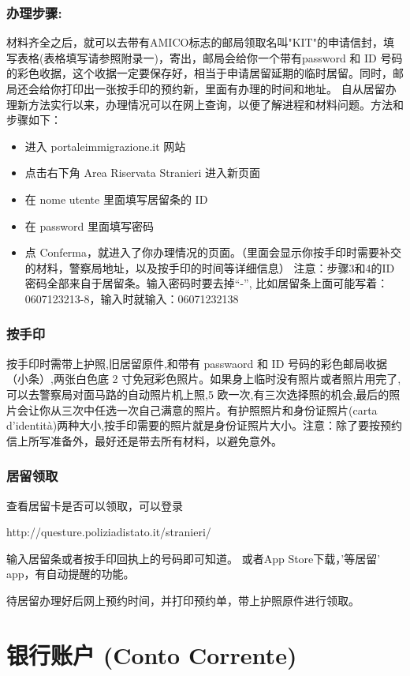 \subsubsection{办理步骤:}
材料齐全之后，就可以去带有AMICO标志的邮局领取名叫"KIT"的申请信封，填写表格(表格填写请参照附录一)，寄出，邮局会给你一个带有password 和 ID 号码的彩色收据，这个收据一定要保存好，相当于申请居留延期的临时居留。同时，邮局还会给你打印出一张按手印的预约新，里面有办理的时间和地址。
自从居留办理新方法实行以来，办理情况可以在网上查询，以便了解进程和材料问题。方法和步骤如下：
\begin{itemize} 
\item 进入 portaleimmigrazione.it 网站
\item 点击右下角 Area Riservata Stranieri 进入新页面
\item 在 nome utente 里面填写居留条的 ID
\item 在 password 里面填写密码
\item 点 Conferma，就进入了你办理情况的页面。（里面会显示你按手印时需要补交的材料，警察局地址，以及按手印的时间等详细信息）
注意：步骤3和4的ID密码全部来自于居留条。输入密码时要去掉“-”, 比如居留条上面可能写着： 0607123213-8，输入时就输入：06071232138
\end{itemize}

\subsubsection{按手印}
按手印时需带上护照,旧居留原件,和带有 passwaord 和 ID 号码的彩色邮局收据（小条）,两张白色底 2 寸免冠彩色照片。如果身上临时没有照片或者照片用完了,可以去警察局对面马路的自动照片机上照,5 欧一次,有三次选择照的机会,最后的照片会让你从三次中任选一次自己满意的照片。有护照照片和身份证照片(carta d'identit\`a)两种大小,按手印需要的照片就是身份证照片大小。注意：除了要按预约信上所写准备外，最好还是带去所有材料，以避免意外。

\subsubsection{居留领取}
查看居留卡是否可以领取，可以登录

http://questure.poliziadistato.it/stranieri/

输入居留条或者按手印回执上的号码即可知道。
或者App Store下载，’等居留’ app，有自动提醒的功能。

待居留办理好后网上预约时间，并打印预约单，带上护照原件进行领取。

\section{银行账户 (Conto Corrente)}

